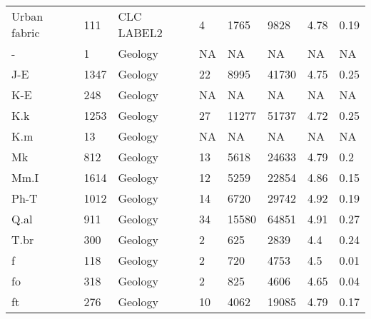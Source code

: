 \begin{sidewaystable*}
\begin{tabular*}{\textwidth}{@{\extracolsep{\fill}}llllllll@{\extracolsep{\fill}}}
Urban fabric                                    & 111  & CLC LABEL2           & 4       & 1765           & 9828          & 4.78          & 0.19        \\
-                                               & 1    & Geology              & NA      & NA             & NA            & NA            & NA          \\
J-E                                             & 1347 & Geology              & 22      & 8995           & 41730         & 4.75          & 0.25        \\
K-E                                             & 248  & Geology              & NA      & NA             & NA            & NA            & NA          \\
K.k                                             & 1253 & Geology              & 27      & 11277          & 51737         & 4.72          & 0.25        \\
K.m                                             & 13   & Geology              & NA      & NA             & NA            & NA            & NA          \\
Mk                                              & 812  & Geology              & 13      & 5618           & 24633         & 4.79          & 0.2         \\
Mm.I                                            & 1614 & Geology              & 12      & 5259           & 22854         & 4.86          & 0.15        \\
Ph-T                                            & 1012 & Geology              & 14      & 6720           & 29742         & 4.92          & 0.19        \\
Q.al                                            & 911  & Geology              & 34      & 15580          & 64851         & 4.91          & 0.27        \\
T.br                                            & 300  & Geology              & 2       & 625            & 2839          & 4.4           & 0.24        \\
f                                               & 118  & Geology              & 2       & 720            & 4753          & 4.5           & 0.01        \\
fo                                              & 318  & Geology              & 2       & 825            & 4606          & 4.65          & 0.04        \\
ft                                              & 276  & Geology              & 10      & 4062           & 19085         & 4.79          & 0.17        \\

\end{tabular*}
\end{sidewaystable*}
